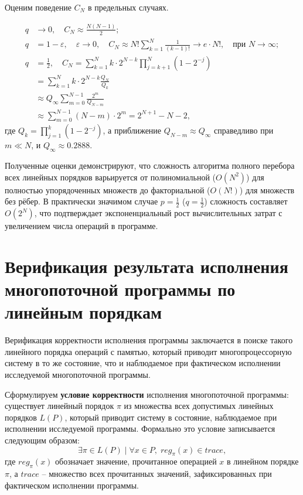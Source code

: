 Оценим поведение $C_N$ в предельных случаях.

\begin{subequations}
  \label{eq:topo-comp-lims}
  \begin{align}
    q &\rightarrow 0,\quad C_N \approx \frac{N(N-1)}{2};
    \label{eq:topo-comp-lims-p1} \\
    q &= 1 - \varepsilon,\quad \varepsilon \rightarrow 0,\quad C_N
    \approx N! \sum_{k=1}^{N} \frac{1}{(k-1)!} \rightarrow e \cdot
    N!, \quad \text{при } N \rightarrow \infty; \label{eq:topo-comp-lims-p0} \\
    q &= \frac{1}{2},\quad C_N = \sum_{k=1}^{N} k \cdot 2^{N-k}
    \prod_{j=k+1}^{N} \left(1 - 2^{-j}\right) \nonumber \\
    &= \sum_{k=1}^{N} k \cdot 2^{N-k} \frac{Q_N}{Q_k} \nonumber \\
    &\approx Q_{\infty} \sum_{m=0}^{N-1} \frac{2^m}{Q_{N-m}} \nonumber \\
    &\approx \sum_{m=0}^{N-1} (N-m) \cdot 2^m = 2^{N+1} - N - 2,
    \label{eq:topo-comp-lims-p12}
  \end{align}
\end{subequations}
где $Q_k = \prod_{j=1}^{k} (1 - 2^{-j})$, а приближение $Q_{N-m}
\approx Q_{\infty}$ справедливо при $m \ll N$, и $Q_{\infty} \approx 0.2888$.

Полученные оценки демонстрируют, что сложность алгоритма полного
перебора всех линейных порядков варьируется от полиномиальной
($O(N^2)$) для полностью упорядоченных множеств до факториальной
($O(N!)$) для множеств без рёбер. В практически значимом случае $p =
\frac{1}{2}$ ($q = \frac{1}{2}$) сложность составляет $O(2^N)$, что
подтверждает экспоненциальный рост вычислительных затрат с
увеличением числа операций в программе.

\section{Верификация результата исполнения многопоточной программы по
линейным порядкам}
\label{sec:ch2/format}

Верификация корректности исполнения программы заключается в поиске
такого линейного порядка операций с памятью, который приводит
многопроцессорную систему в то же состояние, что и наблюдаемое при
фактическом исполнении исследуемой многопоточной программы.

Сформулируем \textbf{условие корректности} исполнения многопоточной
программы: существует линейный порядок $\pi$ из множества всех
допустимых линейных порядков $L(P)$, который приводит систему в
состояние, наблюдаемое при исполнении исследуемой программы.
Формально это условие записывается следующим образом:
\begin{equation}
  \label{eq:verif-base}
  \exists \pi \in L(P) \mid \forall x \in P,\; reg_{\pi}(x) \in trace,
\end{equation}
где $reg_{\pi}(x)$ обозначает значение, прочитанное операцией $x$ в
линейном порядке $\pi$, а $trace$ -- множество всех прочитанных
значений, зафиксированных при фактическом исполнении программы.

